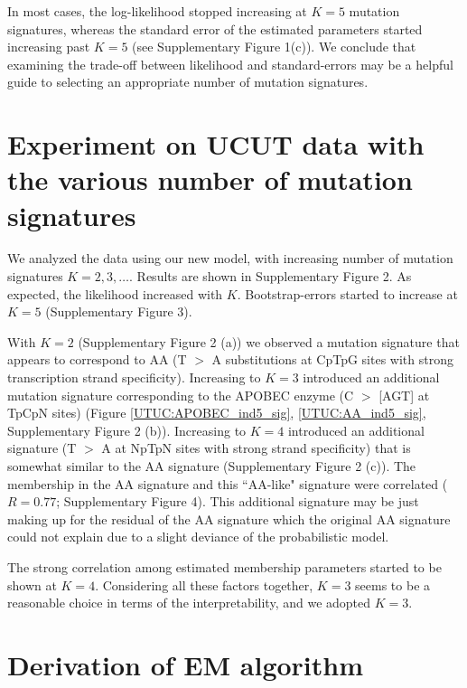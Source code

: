\documentclass{article}
\begin{document}
In most cases, the log-likelihood stopped increasing at $K=5$ mutation signatures, 
whereas the standard error of the estimated parameters started increasing past $K=5$ (see Supplementary Figure 1(c)). We conclude that examining
the trade-off between likelihood and standard-errors may be a helpful guide to selecting an appropriate number of mutation signatures.




\section*{Experiment on UCUT data with the various number of mutation signatures}

We analyzed the data using our new model, with increasing number of mutation signatures $K=2,3,\dots$. 
Results are shown in Supplementary Figure 2.
As expected, the likelihood increased with $K$. Bootstrap-errors started to increase at $K = 5$ (Supplementary Figure 3).

With $K = 2$ (Supplementary Figure 2 (a)) we observed a mutation signature that appears to correspond to AA  (T $>$ A substitutions at CpTpG sites with strong transcription strand specificity).
Increasing to  $K=3$ introduced an additional mutation signature corresponding to the APOBEC enzyme (C $>$ [AGT] at TpCpN sites) (Figure \ref{UTUC:APOBEC_ind5_sig}, \ref{UTUC:AA_ind5_sig}, Supplementary Figure 2 (b)).
Increasing to $K = 4$ introduced an additional signature (T $>$ A at NpTpN sites with strong strand specificity) 
that is somewhat similar to the AA signature 
(Supplementary Figure 2 (c)). 
The membership in the AA signature and this ``AA-like" signature were correlated ($R = 0.77$; Supplementary Figure 4). 
This additional signature may be just making up for the residual of the AA signature 
which the original AA signature could not explain due to a slight deviance of the probabilistic model.

The strong correlation among estimated membership parameters started to be shown at $K = 4$.
Considering all these factors together, $K = 3$ seems to be a reasonable choice in terms of the interpretability,
and we adopted $K = 3$.


\section*{Derivation of EM algorithm}
\end{document}
